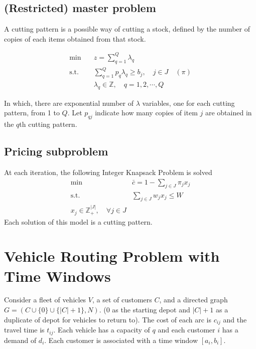             \subsection{(Restricted) master problem}
                A cutting pattern is a possible way of cutting a stock, defined by the number of copies of each items obtained from that stock.

                \begin{align*}
                    \min \quad & z = \sum_{q = 1}^Q \lambda_q\\
                    \text{s.t.} \quad & \sum_{q = 1}^Q p_{q} \lambda_q \ge b_j, \quad j \in J \quad (\pi)\\
                    &\lambda_q \in \mathbb{Z}, \quad q = 1, 2, \cdots, Q
                \end{align*}

                In which, there are exponential number of $\lambda$ variables, one for each cutting pattern, from 1 to $Q$. Let $p_{qj}$ indicate how many copies of item $j$ are obtained in the $q$th cutting pattern.

            \subsection{Pricing subproblem}
                At each iteration, the following Integer Knapsack Problem is solved
                \begin{align*}
                    \min \quad &\bar{c} = 1 - \sum_{j \in J} \pi_j x_j\\
                    \text{s.t.} \quad & \sum_{j \in J} w_j x_j \le W\\
                    x_j \in \mathbb{Z}_+^{|J|}, \quad \forall j \in J
                \end{align*}
                Each solution of this model is a cutting pattern.
            
        \section{Vehicle Routing Problem with Time Windows}
            Consider a fleet of vehicles $V$, a set of customers $C$, and a directed graph $G = (C\cup\{0\}\cup\{|C| + 1\}, N)$. (0 as the starting depot and $|C| + 1$ as a duplicate of depot for vehicles to return to). The cost of each arc is $c_{ij}$ and the travel time is $t_{ij}$. Each vehicle has a capacity of $q$ and each customer $i$ has a demand of $d_i$. Each customer is associated with a time window $[a_i, b_i]$.

